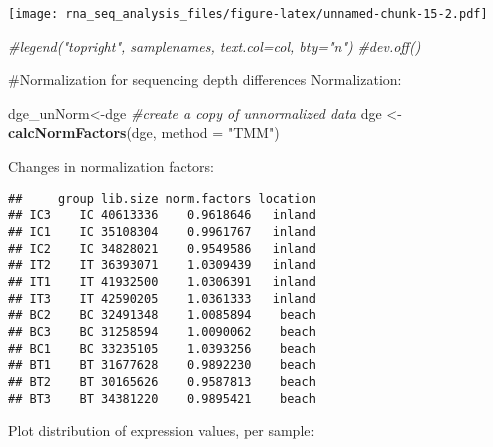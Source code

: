 \documentclass[
]{article}
\newenvironment{Shaded}{\begin{snugshade}}{\end{snugshade}}
\newcommand{\CommentTok}[1]{\textcolor[rgb]{0.56,0.35,0.01}{\textit{#1}}}
\newcommand{\DataTypeTok}[1]{\textcolor[rgb]{0.13,0.29,0.53}{#1}}
\newcommand{\KeywordTok}[1]{\textcolor[rgb]{0.13,0.29,0.53}{\textbf{#1}}}
\newcommand{\NormalTok}[1]{#1}
\newcommand{\OperatorTok}[1]{\textcolor[rgb]{0.81,0.36,0.00}{\textbf{#1}}}
\newcommand{\StringTok}[1]{\textcolor[rgb]{0.31,0.60,0.02}{#1}}
\begin{document}
\texttt{[image: rna\_seq\_analysis\_files/figure-latex/unnamed-chunk-15-2.pdf]}

\begin{Shaded}
\begin{Highlighting}[]
\CommentTok{#legend("topright", samplenames, text.col=col, bty="n")}
\CommentTok{#dev.off()}
\end{Highlighting}
\end{Shaded}

\#Normalization for sequencing depth differences Normalization:

\begin{Shaded}
\begin{Highlighting}[]
\NormalTok{dge_unNorm<-dge }\CommentTok{#create a copy of unnormalized data}
\NormalTok{dge <-}\StringTok{ }\KeywordTok{calcNormFactors}\NormalTok{(dge, }\DataTypeTok{method =} \StringTok{"TMM"}\NormalTok{)}
\end{Highlighting}
\end{Shaded}

Changes in normalization factors:

\begin{Shaded}
\end{Shaded}

\begin{verbatim}
##     group lib.size norm.factors location
## IC3    IC 40613336    0.9618646   inland
## IC1    IC 35108304    0.9961767   inland
## IC2    IC 34828021    0.9549586   inland
## IT2    IT 36393071    1.0309439   inland
## IT1    IT 41932500    1.0306391   inland
## IT3    IT 42590205    1.0361333   inland
## BC2    BC 32491348    1.0085894    beach
## BC3    BC 31258594    1.0090062    beach
## BC1    BC 33235105    1.0393256    beach
## BT1    BT 31677628    0.9892230    beach
## BT2    BT 30165626    0.9587813    beach
## BT3    BT 34381220    0.9895421    beach
\end{verbatim}

Plot distribution of expression values, per sample:
\end{document}
